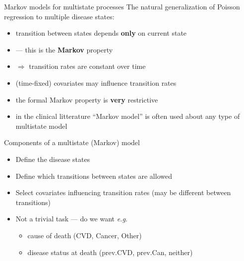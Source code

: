 \begin{frame}{Markov models for multistate processes}
  The natural generalization of Poisson regression to multiple
    disease states:
  \pause
    \begin{itemize}
    \item transition between states depends \textbf{only} on current state
    \item --- this is the \textbf{Markov} property
    \item $\Rightarrow$ transition rates are constant over time
    \item (time-fixed) covariates may influence transition rates
    \item the formal Markov property is \textbf{very} restrictive
    \item in the clinical litterature ``Markov model'' is often used
      about any type of multistate model
    \end{itemize}
\end{frame}


\begin{frame}{Components of a multistate (Markov) model}
  \begin{itemize}
    \item Define the disease states
    \item Define which transitions between states are allowed
    \item Select covariates influencing transition rates (may be
      different between transitions)
    \item Not a trivial task --- do we want \textit{e.g.}

      \begin{itemize}
      \item cause of death (CVD, Cancer, Other)
      \item disease status at death (prev.CVD, prev.Can, neither)
      \end{itemize}

  \end{itemize}
\end{frame}


